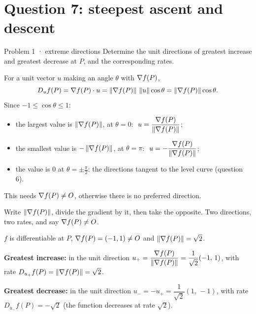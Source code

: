 \section{Question 7: steepest ascent and descent}

\begin{question}{Problem 1 \;·\; extreme directions}
Determine the unit directions of greatest increase and greatest decrease at $P$, and the
corresponding rates.
\end{question}

\begin{lesson}
For a unit vector $u$ making an angle $\theta$ with $\nabla f(P)$,
\[
  D_uf(P)=\nabla f(P)\cdot u=\left\lVert \nabla f(P)\right\rVert\,\left\lVert u\right\rVert\cos\theta=\left\lVert \nabla f(P)\right\rVert\cos\theta .
\]
Since $-1\le\cos\theta\le1$:
\begin{itemize}
  \item the largest value is $\left\lVert \nabla f(P)\right\rVert$, at $\theta=0$: $\ u=\dfrac{\nabla f(P)}{\left\lVert \nabla f(P)\right\rVert}$;
  \item the smallest value is $-\left\lVert \nabla f(P)\right\rVert$, at $\theta=\pi$: $\ u=-\dfrac{\nabla f(P)}{\left\lVert \nabla f(P)\right\rVert}$;
  \item the value is $0$ at $\theta=\pm\frac\pi2$: the directions tangent to the level curve (question 6).
\end{itemize}
This needs $\nabla f(P)\ne O$, otherwise there is no preferred direction.
\end{lesson}

\begin{howto}
Write $\left\lVert \nabla f(P)\right\rVert$, divide the gradient by it, then take the opposite. Two directions, two
rates, and say $\nabla f(P)\ne O$.
\end{howto}

\begin{answer}
$f$ is differentiable at $P$, $\nabla f(P)=(-1,1)\ne O$ and $\left\lVert \nabla f(P)\right\rVert=\sqrt2$.

\textbf{Greatest increase:} in the unit direction $u_+=\dfrac{\nabla f(P)}{\left\lVert \nabla f(P)\right\rVert}=\dfrac1{\sqrt2}(-1,\,1)$,
with rate $D_{u_+}f(P)=\left\lVert \nabla f(P)\right\rVert=\sqrt2$.

\textbf{Greatest decrease:} in the unit direction $u_-=-u_+=\dfrac1{\sqrt2}(1,\,-1)$, with rate
$D_{u_-}f(P)=-\sqrt2$ (the function decreases at rate $\sqrt2$).
\end{answer}

